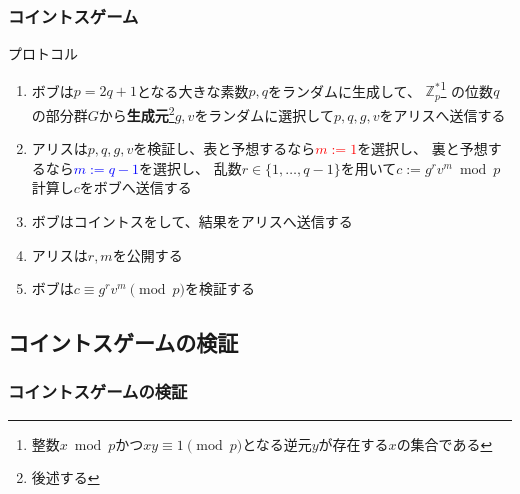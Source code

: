 \begin{frame}[fragile, label=protocol]
  \frametitle{コイントスゲーム}

  \begin{block}{プロトコル}
    \begin{enumerate}
      \item<2-> ボブは$p = 2q + 1$となる大きな素数$p, q$をランダムに生成して、
        $\mathbb{Z}^*_p$\footnote[frame]{整数$x \bmod p$かつ$xy \equiv 1 \pmod{p}$となる逆元$y$が存在する$x$の集合である}
        の位数$q$の部分群$G$から\textbf{生成元}\footnote[frame]{後述する}$g, v$をランダムに選択して$p, q, g, v$をアリスへ送信する
      \item<3-> アリスは$p, q, g, v$を検証し、表と予想するなら\textcolor{red}{$m := 1$}を選択し、
        裏と予想するなら\textcolor{blue}{$m := q - 1$}を選択し、
        乱数$r \in \{1, \dots, q - 1\}$を用いて$c := g^r v^m \bmod p$計算し$c$をボブへ送信する
      \item<4-> ボブはコイントスをして、結果をアリスへ送信する
      \item<5-> アリスは$r, m$を公開する
      \item<6-> ボブは$c \equiv g^r v^m \pmod{p}$を検証する
    \end{enumerate}
  \end{block}
\end{frame}

\subsection{コイントスゲームの検証}
\begin{frame}[fragile, label=mdash]
  \frametitle{コイントスゲームの検証}
  
  \begin{center}



  \end{center}
\end{frame}

